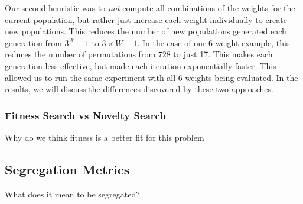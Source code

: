 Our second heuristic was to \emph{not} compute all combinations of the weights for the current population, but rather just increase each weight individually to create new populations. 
This reduces the number of new populations generated each generation from $3^W - 1$ to $3 \times W - 1$. 
In the case of our 6-weight example, this reduces the number of permutations from 728 to just 17. 
This makes each generation less effective, but made each iteration exponentially faster. 
This allowed us to run the same experiment with all 6 weights being evaluated. 
In the results, we will discuss the differences discovered by these two approaches.


\subsubsection{Fitness Search vs Novelty Search}

Why do we think fitness is a better fit for this problem

\subsection{Segregation Metrics}

What does it mean to be segregated? 

